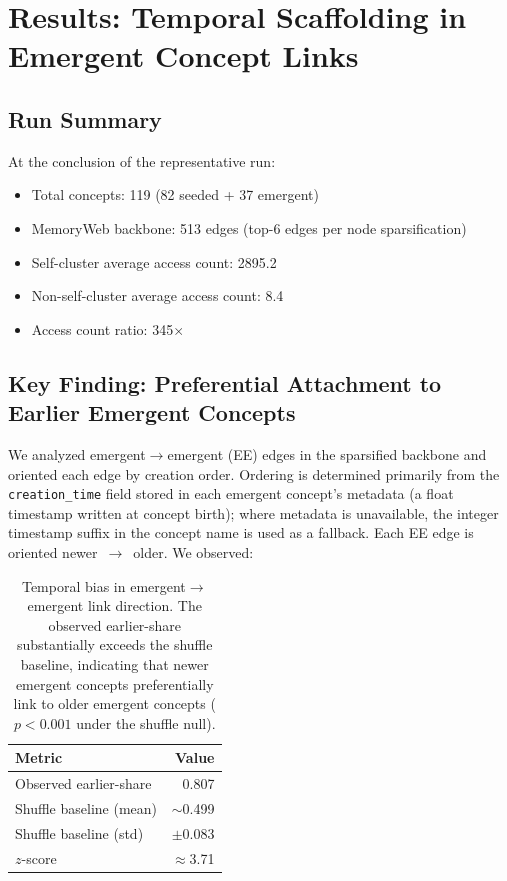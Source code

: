 \documentclass[11pt,a4paper]{article}
\begin{document}
\section{Results: Temporal Scaffolding in Emergent Concept Links}

\subsection{Run Summary}

At the conclusion of the representative run:

\begin{itemize}[nosep]
    \item Total concepts: 119 (82 seeded + 37 emergent)
    \item MemoryWeb backbone: 513 edges (top-6 edges per node sparsification)
    \item Self-cluster average access count: 2895.2
    \item Non-self-cluster average access count: 8.4
    \item Access count ratio: 345$\times$
\end{itemize}

\subsection{Key Finding: Preferential Attachment to Earlier Emergent Concepts}

We analyzed emergent$\to$emergent (EE) edges in the sparsified backbone and 
oriented each edge by creation order. Ordering is determined primarily from 
the \texttt{creation\_time} field stored in each emergent concept's metadata 
(a float timestamp written at concept birth); where metadata is unavailable, 
the integer timestamp suffix in the concept name is used as a fallback. Each 
EE edge is oriented newer~$\to$~older. We observed:

\begin{table}[H]
\centering
\begin{tabular}{lr}
\toprule
\textbf{Metric} & \textbf{Value} \\
\midrule
Observed earlier-share & 0.807 \\
Shuffle baseline (mean) & $\sim$0.499 \\
Shuffle baseline (std) & $\pm$0.083 \\
$z$-score & $\approx$3.71 \\
\bottomrule
\end{tabular}
\caption{Temporal bias in emergent$\to$emergent link direction. The observed 
earlier-share substantially exceeds the shuffle baseline, indicating that 
newer emergent concepts preferentially link to older emergent concepts 
($p < 0.001$ under the shuffle null).}
\label{tab:scaffolding}
\end{table}
\end{document}
